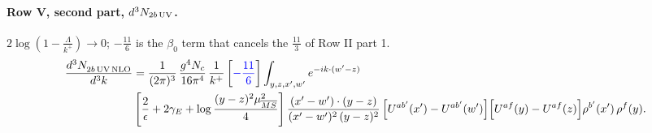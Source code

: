 \documentclass[10pt]{article}
\numberwithin{equation}{section}
\newcommand{\new}[1]{{\color{blue}#1}}
\begin{document}
\paragraph{Row V, second part, $d^3N_{2b\,\rm UV}$.}
$2\log(1-\frac{\Lambda}{k^+})\to0$; $-\frac{11}{6}$ is the $\beta_0$ term that cancels the $\frac{11}{3}$ of Row II part 1.
\begin{align}
\frac{d^{3}N_{2b\,\rm UV\, NLO}^{\rm}}{d^{3}k} & =  \frac{1}{(2\pi)^{3}}\,\frac{g^{4}N_{c}}{16\pi^{4}}\,\frac{1}{k^{+}}
\left[\new{-\frac{11}{6}}\right]\int_{y,z,x',w'}e^{-ik\cdot(w'-z)}\notag \\ & \left[\frac{2}{\epsilon}+2\gamma_{E}+\log\frac{(y-z)^{2}\mu^{2}_{\overline{MS}}}{4}\right]
\frac{(x'-w')\cdot(y-z)}{(x'-w')^{2}\,(y-z)^{2}}\, \Big[U^{ab'}(x')-U^{ab'}(w')\Big]\Big[U^{af}(y)-U^{af}(z)\Big]\rho^{b'}(x')\,\rho^{f}(y). \label{eq:F:G1V2bUV}
\end{align}
\end{document}
